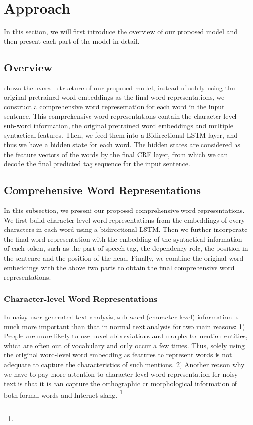 \section{Approach}
\label{sec:approach}
In this section, we will first introduce the overview of our proposed model and then present each part of the model in detail.

\subsection{Overview}
 shows the overall structure of our proposed model, 
instead of solely using the original pretrained word embeddings as the final word representations, 
we construct a comprehensive word representation for each word in the input sentence.
This comprehensive word representations contain the character-level sub-word information, the original pretrained word embeddings and multiple syntactical features. 
Then, we feed them into a Bidirectional LSTM layer, and thus we have a hidden state for each word. 
The hidden states are considered as the feature vectors of the words by the final CRF layer, from which we can decode the final predicted tag sequence for the input sentence.

\subsection{Comprehensive Word Representations}
In this subsection, we present our proposed comprehensive word representations. 
We first build character-level word representations from the embeddings of every characters in each word using a bidirectional LSTM. 
Then we further incorporate the final word representation with the embedding of the syntactical information of each token, such as the part-of-speech tag, the dependency role, the position in the sentence and the position of the head. 
Finally, we combine the original word embeddings with the above two parts to obtain the final comprehensive word representations.

\subsubsection{Character-level Word Representations}
In noisy user-generated text analysis, sub-word (character-level) information is much more important than that in normal text analysis for two main reasons:
1) People are more likely to use novel abbreviations and morphs to mention entities, which are often out of vocabulary and only occur a few times. 
Thus, solely using the original word-level word embedding as features to represent  words is not adequate to capture the characteristics of such mentions.
2) Another reason why we have to pay more attention to character-level word representation for noisy text is that it is can capture the orthographic or morphological information of both formal words and Internet slang.
\footnote{} 

